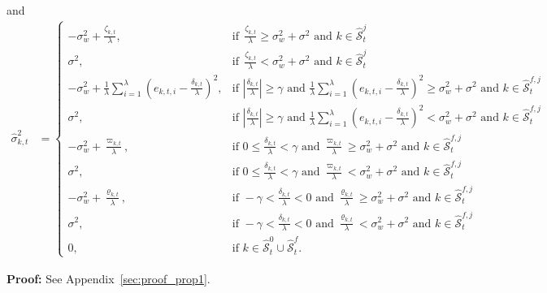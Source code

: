 \documentclass[onecolumn]{IEEEtran}
\begin{document}
and
\begin{align} \label{eq:sigma_hat_kt_v3_rrr}
\hat{\sigma}_{k,t}^2 &=
    \begin{cases}
     - \sigma_w^2 + \frac{\zeta_{k,t}}{\lambda}, & \text{if} ~~ \frac{\zeta_{k,t}}{\lambda} \geq \sigma_w^2 + \sigma^2 \mbox{ and } k \in \hat{\mathcal{S}}_t^j  \\
     \sigma^2 , & \text{if} ~~ \frac{\zeta_{k,t}}{\lambda} < \sigma_w^2 + \sigma^2 \mbox{ and } k \in \hat{\mathcal{S}}_t^j \\
     - \sigma_w^2 + \frac{1}{\lambda} \sum_{i=1}^{\lambda} (e_{k,t,i} - \frac{\delta_{k,t}}{\lambda})^2, & \mbox{if } |\frac{\delta_{k,t}}{\lambda}| \geq \gamma \mbox{ and } \frac{1}{\lambda} \sum_{i=1}^{\lambda} (e_{k,t,i} - \frac{\delta_{k,t}}{\lambda})^2 \geq \sigma_w^2 + \sigma^2 \mbox{ and } k \in \hat{\mathcal{S}}_t^{f,j} \\
     \sigma^2, & \mbox{if } |\frac{\delta_{k,t}}{\lambda}| \geq \gamma \mbox{ and } \frac{1}{\lambda} \sum_{i=1}^{\lambda} (e_{k,t,i} - \frac{\delta_{k,t}}{\lambda})^2 < \sigma_w^2 + \sigma^2 \mbox{ and } k \in \hat{\mathcal{S}}_t^{f,j} \\
     - \sigma_w^2 + \frac{\varpi_{k,t}}{\lambda}, & \mbox{if } 0 \leq \frac{\delta_{k,t}}{\lambda} < \gamma \mbox{ and } \frac{\varpi_{k,t}}{\lambda} \geq \sigma_w^2 + \sigma^2 \mbox{ and } k \in \hat{\mathcal{S}}_t^{f,j} \\
     \sigma^2, & \mbox{if } 0 \leq \frac{\delta_{k,t}}{\lambda} < \gamma \mbox{ and } \frac{\varpi_{k,t}}{\lambda} < \sigma_w^2 + \sigma^2 \mbox{ and } k \in \hat{\mathcal{S}}_t^{f,j} \\
     - \sigma_w^2 + \frac{\varrho_{k,t}}{\lambda}, & \mbox{if } -\gamma < \frac{\delta_{k,t}}{\lambda} < 0 \mbox{ and } \frac{\varrho_{k,t}}{\lambda} \geq \sigma_w^2 + \sigma^2 \mbox{ and } k \in \hat{\mathcal{S}}_t^{f,j} \\
     \sigma^2, & \mbox{if } -\gamma < \frac{\delta_{k,t}}{\lambda} < 0 \mbox{ and } \frac{\varrho_{k,t}}{\lambda} < \sigma_w^2 + \sigma^2 \mbox{ and } k \in \hat{\mathcal{S}}_t^{f,j} \\
     0, & \mbox{if } k \in \hat{\mathcal{S}}_t^0 \cup \hat{\mathcal{S}}_t^f.
    \end{cases}
\end{align}

\textbf{Proof:} See Appendix~\ref{sec:proof_prop1}.
\end{document}

